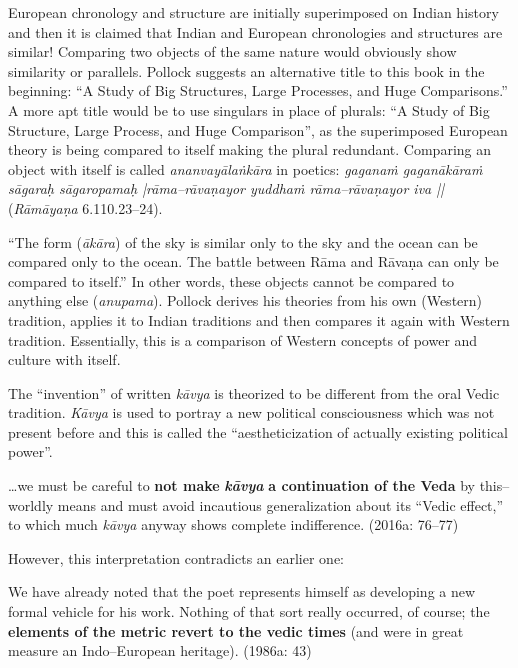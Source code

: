 European chronology and structure are initially superimposed on Indian history and then it is claimed that Indian and European chronologies and structures are similar! Comparing two objects of the same nature would obviously show similarity or parallels. Pollock suggests an alternative title to this book in the beginning: “A Study of Big Structures, Large Processes, and Huge Comparisons.” A more apt title would be to use singulars in place of plurals: “A Study of Big Structure, Large Process, and Huge Comparison”, as the superimposed European theory is being compared to itself making the plural redundant. Comparing an object with itself is called \textit{ananvayālaṅkāra} in poetics: \textit{gaganaṁ gaganākāraṁ sāgaraḥ sāgaropamaḥ |rāma–rāvaṇayor yuddhaṁ rāma–rāvaṇayor iva || }(\textit{Rāmāyaṇa} 6.110.23–24).

“The form (\textit{ākāra}) of the sky is similar only to the sky and the ocean can be compared only to the ocean. The battle between Rāma and Rāvaṇa can only be compared to itself.” In other words, these objects cannot be compared to anything else (\textit{anupama}). Pollock derives his theories from his own (Western) tradition, applies it to Indian traditions and then compares it again with Western tradition. Essentially, this is a comparison of Western concepts of power and culture with itself.

The “invention” of written \textit{kāvya} is theorized to be different from the oral Vedic tradition. \textit{Kāvya }is used to portray a new political consciousness which was not present before and this is called the “aestheticization of actually existing political power”.

\begin{myquote}
…we must be careful to \textbf{not make }\textit{\textbf{kāvya }}\textbf{a continuation of the Veda} by this–worldly means and must avoid incautious generalization about its “Vedic effect,” to which much\textit{ kāvya }anyway shows complete indifference. (2016a: 76–77)
\end{myquote}

\newpage

However, this interpretation contradicts an earlier one:

\begin{myquote}
We have already noted that the poet represents himself as developing a new formal vehicle for his work. Nothing of that sort really occurred, of course; the \textbf{elements of the metric revert to the vedic times} (and were in great measure an Indo–European heritage). (1986a: 43)
\end{myquote}


